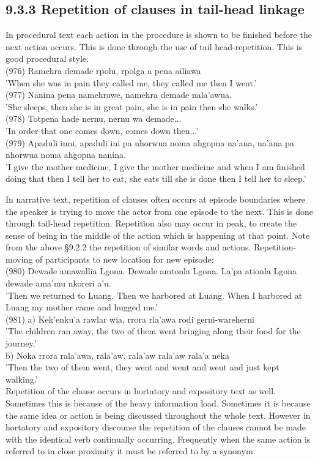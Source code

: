 \documentclass[10pt]{article}
\begin{document}
\subsection*{9.3.3 Repetition of clauses in tail-head linkage}
In procedural text each action in the procedure is shown to be finished before the next action occurs. This is done through the use of tail head-repetition. This is good procedural style.\\
(976) Ramehra demade rpolu, rpolga a pena ailiawa\\
'When she was in pain they called me, they called me then I went.'\\
(977) Nanina pena namehrawe, namehra demade nala'awua.\\
'She sleeps, then she is in great pain, she is in pain then she walks.'\\
(978) Totpena hade nernu, nernu wa demade...\\
'In order that one comes down, comes down then...'\\
(979) Apaduli inni, apaduli ini pa nhorwua noma ahgopna na'ana, na'ana pa nhorwua noma ahgopna nanina.\\
'I give the mother medicine, I give the mother medicine and when I am finished doing that then I tell her to eat, she eats till she is done then I tell her to sleep.'

In narrative text, repetition of clauses often occurs at episode boundaries where the speaker is trying to move the actor from one episode to the next. This is done through tail-head repetition. Repetition also may occur in peak, to create the sense of being in the middle of the action which is happening at that point. Note from the above §9.2.2 the repetition of similar words and actions. Repetition-moving of participants to new location for new episode:\\
(980) Dewade amawallia Lgona. Dewade amtonla Lgona. La'pa ationla Lgona dewade ama'mu nkoreri a'u.\\
'Then we returned to Luang. Then we harbored at Luang. When I harbored at Luang my mother came and hugged me.'\\
(981) a) Kek'enku'a rawlar wia, rrora rla'awa rodi gerni-wareherni\\
'The children ran away, the two of them went bringing along their food for the journey.'\\
b) Noka rrora rala'awa, rala'aw, rala'aw rala'aw rala'a neka\\
'Then the two of them went, they went and went and went and just kept walking.'\\
Repetition of the clause occurs in hortatory and expository text as well. Sometimes this is because of the heavy information load. Sometimes it is because the same idea or action is being discussed throughout the whole text. However in hortatory and expository discourse the repetition of the clauses cannot be made with the identical verb continually occurring. Frequently when the same action is referred to in close proximity it must be referred to by a synonym.
\end{document}
